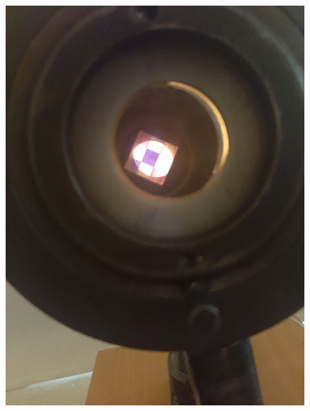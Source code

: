 \documentclass[14pt, a4paper]{report}
\begin{document}
\begin{enumerate}
\begin{figure}[H]
\includegraphics[scale=0.2]{../images/473_10}
\end{figure}

\end{enumerate}
\end{document}
